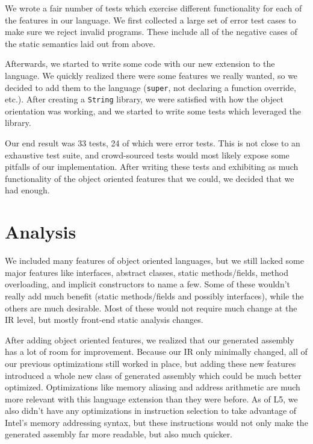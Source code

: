 \documentclass{article}
\begin{document}
We wrote a fair number of tests which exercise different
functionality for each of the features in our language. We first collected a
large set of error test cases to make sure we reject invalid programs. These
include all of the negative cases of the static semantics laid out from above.

Afterwards, we started to write some code with our new extension to the
language. We quickly realized there were some features we really wanted, so we
decided to add them to the language (\texttt{super}, not declaring a function
override, etc.). After creating a \texttt{String} library, we were satisfied
with how the object orientation was working, and we started to write some tests
which leveraged the library.

Our end result was 33 tests, 24 of which were error tests. This is not close to
an exhaustive test suite, and crowd-sourced tests would most likely expose some
pitfalls of our implementation. After writing these tests and exhibiting as much
functionality of the object oriented features that we could, we decided that
we had enough.

\section{Analysis}

We included many features of object oriented languages, but we still lacked some
major features like interfaces, abstract classes, static methods/fields, method
overloading, and implicit constructors to name a few. Some of these wouldn't
really add much benefit (static methods/fields and possibly interfaces), while
the others are much desirable. Most of these would not require much change at
the IR level, but mostly front-end static analysis changes.

After adding object oriented features, we realized that our generated assembly
has a lot of room for improvement. Because our IR only minimally changed, all of
our previous optimizations still worked in place, but adding these new features
introduced a whole new class of generated assembly which could be much better
optimized. Optimizations like memory aliasing and address arithmetic are much
more relevant with this language extension than they were before. As of L5,
we also didn't have any optimizations in instruction selection to take advantage
of Intel's memory addressing syntax, but these instructions would not only make
the generated assembly far more readable, but also much quicker.
\end{document}
